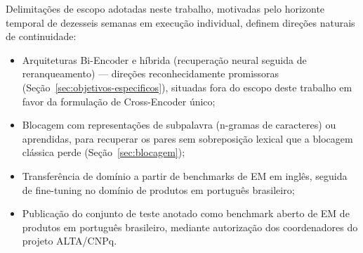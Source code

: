 \documentclass[
    article,
    12pt,
    oneside,
    a4paper,
    english,
    brazilian
    ]{abntex2}
\numberwithin{equation}{section}
\begin{document}
Delimitações de escopo adotadas neste trabalho, motivadas pelo horizonte temporal de dezesseis semanas em execução individual, definem direções naturais de continuidade:

\begin{itemize}
    \item Arquiteturas Bi-Encoder e híbrida (recuperação neural seguida de reranqueamento) --- direções reconhecidamente promissoras (Seção~\ref{sec:objetivos-especificos}), situadas fora do escopo deste trabalho em favor da formulação de Cross-Encoder único;
    \item Blocagem com representações de subpalavra (n-gramas de caracteres) ou aprendidas, para recuperar os pares sem sobreposição lexical que a blocagem clássica perde (Seção~\ref{sec:blocagem});
    \item Transferência de domínio a partir de benchmarks de EM em inglês, seguida de fine-tuning no domínio de produtos em português brasileiro;
    \item Publicação do conjunto de teste anotado como benchmark aberto de EM de produtos em português brasileiro, mediante autorização dos coordenadores do projeto ALTA/CNPq.
\end{itemize}
\end{document}
